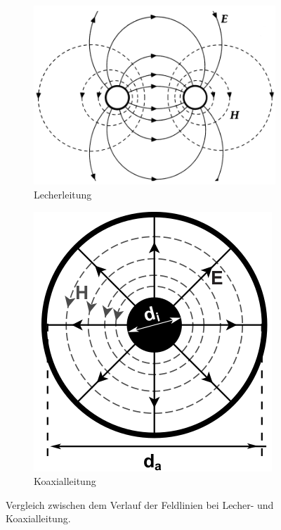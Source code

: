 \documentclass[
	a4paper,
	12pt,
	pagesize,
	ngerman
]{scrartcl}
\begin{document}
	\begin{figure}[H]
        \centering
        \begin{subfigure}[b]{0.55\textwidth}
            \centering
            \includegraphics[width=\textwidth]{img/lecher}
            \caption{
							Lecherleitung
						}
            \label{fig_lecher}
        \end{subfigure}
        \hfill
        \begin{subfigure}[b]{0.40\textwidth}
            \centering
            \includegraphics[width=\textwidth]{img/koaxial}
            \caption{
						Koaxialleitung
						}
            \label{fig_koaxial}
        \end{subfigure}

        \caption{Vergleich zwischen dem Verlauf der Feldlinien bei Lecher- und Koaxialleitung. \cite{Anleitung}}
				\label{fig_lecherkoaxial}
	\end{figure}
\end{document}
